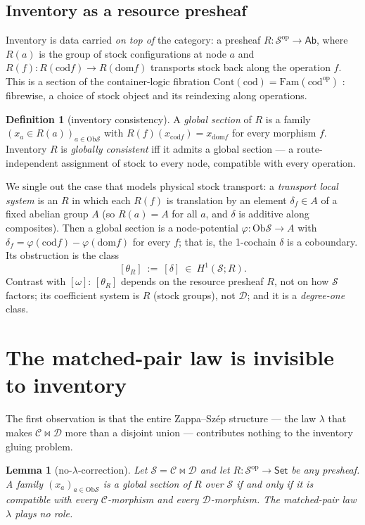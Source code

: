 \documentclass[11pt]{article}
\newtheorem{lemma}[theorem]{Lemma}
\theoremstyle{definition}
\newtheorem{definition}[theorem]{Definition}
\newcommand{\Set}{\mathsf{Set}}
\newcommand{\Ab}{\mathsf{Ab}}
\newcommand{\Sc}{\mathcal{S}}
\newcommand{\C}{\mathcal{C}}
\newcommand{\D}{\mathcal{D}}
\newcommand{\Ob}{\mathrm{Ob}}
\newcommand{\dom}{\mathrm{dom}}
\newcommand{\cod}{\mathrm{cod}}
\newcommand{\bowtiemap}{\bowtie}
\begin{document}
\subsection{Inventory as a resource presheaf}

Inventory is data carried \emph{on top of} the category: a presheaf
$R\colon\Sc^{\mathrm{op}}\to\Ab$, where $R(a)$ is the group of stock configurations at node $a$
and $R(f)\colon R(\cod f)\to R(\dom f)$ transports stock back along the operation $f$. This is a
section of the container-logic fibration $\mathrm{Cont}(\cod)=\mathrm{Fam}(\cod^{\mathrm{op}})$
\cite{coflog}: fibrewise, a choice of stock object and its reindexing along operations.

\begin{definition}[inventory consistency]\label{def:consistency}
A \emph{global section} of $R$ is a family $(x_a\in R(a))_{a\in\Ob\Sc}$ with
$R(f)(x_{\cod f})=x_{\dom f}$ for every morphism $f$. Inventory $R$ is \emph{globally
consistent} iff it admits a global section --- a route-independent assignment of stock to every
node, compatible with every operation.
\end{definition}

We single out the case that models physical stock transport: a \emph{transport local system}
is an $R$ in which each $R(f)$ is translation by an element $\delta_f\in A$ of a fixed abelian
group $A$ (so $R(a)=A$ for all $a$, and $\delta$ is additive along composites). Then a global
section is a node-potential $\varphi\colon\Ob\Sc\to A$ with
$\delta_f=\varphi(\cod f)-\varphi(\dom f)$ for every $f$; that is, the 1-cochain $\delta$ is a
coboundary. Its obstruction is the class
\[
  [\theta_R]\ :=\ [\delta]\ \in\ H^1(\Sc;R).
\]
Contrast with $[\omega]$: $[\theta_R]$ depends on the resource presheaf $R$, not on how $\Sc$
factors; its coefficient system is $R$ (stock groups), not $\D$; and it is a \emph{degree-one}
class.

\section{The matched-pair law is invisible to inventory}\label{sec:lemma}

The first observation is that the entire Zappa--Sz\'ep structure --- the law $\lambda$ that
makes $\C\bowtiemap\D$ more than a disjoint union --- contributes nothing to the inventory
gluing problem.

\begin{lemma}[no-$\lambda$-correction]\label{lem:nolambda}
Let $\Sc=\C\bowtiemap\D$ and let $R\colon\Sc^{\mathrm{op}}\to\Set$ be any presheaf. A family
$(x_a)_{a\in\Ob\Sc}$ is a global section of $R$ over $\Sc$ if and only if it is compatible with
every $\C$-morphism and every $\D$-morphism. The matched-pair law $\lambda$ plays no role.
\end{lemma}
\end{document}
